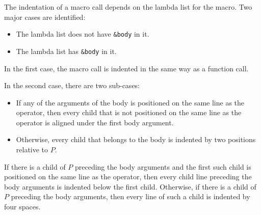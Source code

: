 The indentation of a macro call depends on the lambda list for the
macro.  Two major cases are identified:

\begin{itemize}
\item The lambda list does not have \texttt{\&body} in it.
\item The lambda list has \texttt{\&body} in it.
\end{itemize}

In the first case, the macro call is indented in the same way as a
function call.

In the second case, there are two sub-cases:

\begin{itemize}
\item If any of the arguments of the body is positioned on the same
  line as the operator, then every child that is not positioned on the
  same line as the operator is aligned under the first body argument.
\item Otherwise, every child that belongs to the body is indented by
  two positions relative to $P$.
\end{itemize}

If there is a child of $P$ preceding the body arguments and the first
such child is positioned on the same line as the operator, then every
child line preceding the body arguments is indented below the first
child.  Otherwise, if there is a child of $P$ preceding the body
arguments, then every line of such a child is indented by four spaces.
